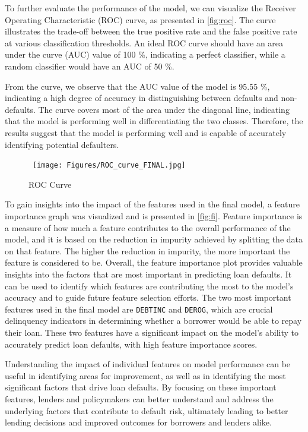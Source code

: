 To further evaluate the performance of the model, we can visualize the Receiver Operating Characteristic (ROC) curve, as presented in \autoref{fig:roc}. The curve illustrates the trade-off between the true positive rate and the false positive rate at various classification thresholds. An ideal ROC curve should have an area under the curve (AUC) value of 100 \%, indicating a perfect classifier, while a random classifier would have an AUC of 50 \%.

From the curve, we observe that the AUC value of the model is 95.55 \%, indicating a high degree of accuracy in distinguishing between defaults and non-defaults. The curve covers most of the area under the diagonal line, indicating that the model is performing well in differentiating the two classes. Therefore, the results suggest that the model is performing well and is capable of accurately identifying potential defaulters.

\begin{figure}[H]
    \centering
    \caption{ROC Curve}\vspace{0.5em}
    \label{fig:roc}\
    \texttt{[image: Figures/ROC\_curve\_FINAL.jpg]}
    \vspace{-1em}
\end{figure}
To gain insights into the impact of the features used in the final model, a feature importance graph was visualized and is presented in \autoref{fig:fi}.
Feature importance is a measure of how much a feature contributes to the overall performance of the model, and it is based on the reduction in impurity achieved by splitting the data on that feature.
The higher the reduction in impurity, the more important the feature is considered to be.
Overall, the feature importance plot provides valuable insights into the factors that are most important in predicting loan defaults. It can be used to identify which features are contributing the most to the model's accuracy and to guide future feature selection efforts.
The two most important features used in the final model are \texttt{DEBTINC} and \texttt{DEROG}, which are crucial delinquency indicators in determining whether a borrower would be able to repay their loan. These two features have a significant impact on the model's ability to accurately predict loan defaults, with high feature importance scores.

Understanding the impact of individual features on model performance can be useful in identifying areas for improvement, as well as in identifying the most significant factors that drive loan defaults.
By focusing on these important features, lenders and policymakers can better understand and address the underlying factors that contribute to default risk, ultimately leading to better lending decisions and improved outcomes for borrowers and lenders alike.

